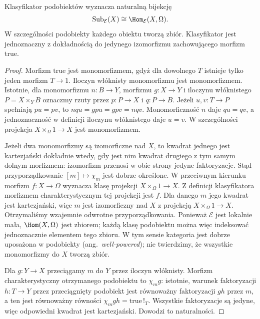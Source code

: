 \begin{twierdzenie}\label{cat:thm:subobject-classifier-representation}
Klasyfikator podobiektów wyznacza naturalną bijekcję
\[
 \operatorname{Sub}_{\mathcal E}(X)\cong\Hom_{\mathcal E}(X,\Omega).
\]
W szczególności podobiekty każdego obiektu tworzą zbiór. Klasyfikator jest jednoznaczny z dokładnością do jedynego izomorfizmu zachowującego morfizm $\mathrm{true}$.
\end{twierdzenie}
\begin{proof}
Morfizm $\mathrm{true}$ jest monomorfizmem, gdyż dla dowolnego $T$ istnieje tylko jeden morfizm $T\to1$. Iloczyn włóknisty monomorfizmu jest monomorfizmem. Istotnie, dla monomorfizmu $n:B\to Y$, morfizmu $g:X\to Y$ i iloczynu włóknistego $P=X\times_Y B$ oznaczmy rzuty przez $p:P\to X$ i $q:P\to B$. Jeżeli $u,v:T\to P$ spełniają $pu=pv$, to $nqu=gpu=gpv=nqv$. Monomorficzność $n$ daje $qu=qv$, a jednoznaczność w definicji iloczynu włóknistego daje $u=v$. W szczególności projekcja $X\times_\Omega1\to X$ jest monomorfizmem.

Jeżeli dwa monomorfizmy są izomorficzne nad $X$, to kwadrat jednego jest kartezjański dokładnie wtedy, gdy jest nim kwadrat drugiego z tym samym dolnym morfizmem: izomorfizm przenosi w obie strony jedyne faktoryzacje. Stąd przyporządkowanie $[m]\mapsto\chi_m$ jest dobrze określone. W przeciwnym kierunku morfizm $f:X\to\Omega$ wyznacza klasę projekcji $X\times_\Omega1\to X$. Z definicji klasyfikatora morfizmem charakterystycznym tej projekcji jest $f$. Dla danego $m$ jego kwadrat jest kartezjański, więc $m$ jest izomorficzny nad $X$ z projekcją $X\times_\Omega1\to X$. Otrzymaliśmy wzajemnie odwrotne przyporządkowania. Ponieważ $\mathcal E$ jest lokalnie mała, $\Hom(X,\Omega)$ jest zbiorem; każdą klasę podobiektu można więc indeksować jednoznacznie elementem tego zbioru. W tym sensie kategoria jest dobrze uposażona w podobiekty (ang.\ \emph{well-powered}); nie twierdzimy, że wszystkie monomorfizmy do $X$ tworzą zbiór.

Dla $g:Y\to X$ przeciągamy $m$ do $Y$ przez iloczyn włóknisty. Morfizm charakterystyczny otrzymanego podobiektu to $\chi_m g$: istotnie, warunek faktoryzacji $h:T\to Y$ przez przeciągnięty podobiekt jest równoważny faktoryzacji $gh$ przez $m$, a ten jest równoważny równości $\chi_m gh=\mathrm{true}\,!_T$. Wszystkie faktoryzacje są jedyne, więc odpowiedni kwadrat jest kartezjański. Dowodzi to naturalności.


\end{proof}
